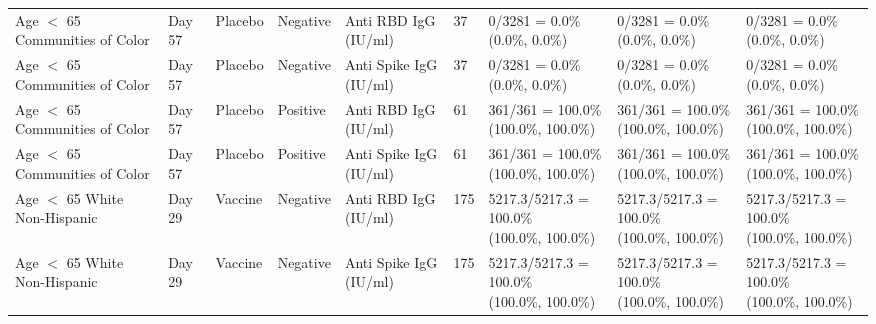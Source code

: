\documentclass[]{book}
\theoremstyle{definition}
\theoremstyle{definition}
\theoremstyle{definition}
\newcommand{\1}{\mathbbm{1}}
\begin{document}
\begin{landscape}
\begin{ThreePartTable}
\begin{longtable}[t]{>{\raggedright\arraybackslash}p{2.7cm}llllllll}
\hspace{1em}Age $<$ 65 Communities of Color & Day 57 & Placebo & Negative & Anti RBD IgG (IU/ml) & 37 & \makecell[l]{0/3281 = 0.0\%\\(0.0\%, 0.0\%)} & \makecell[l]{0/3281 = 0.0\%\\(0.0\%, 0.0\%)} & \makecell[l]{0/3281 = 0.0\%\\(0.0\%, 0.0\%)}\\
\hspace{1em}Age $<$ 65 Communities of Color & Day 57 & Placebo & Negative & Anti Spike IgG (IU/ml) & 37 & \makecell[l]{0/3281 = 0.0\%\\(0.0\%, 0.0\%)} & \makecell[l]{0/3281 = 0.0\%\\(0.0\%, 0.0\%)} & \makecell[l]{0/3281 = 0.0\%\\(0.0\%, 0.0\%)}\\
\hspace{1em}Age $<$ 65 Communities of Color & Day 57 & Placebo & Positive & Anti RBD IgG (IU/ml) & 61 & \makecell[l]{361/361 = 100.0\%\\(100.0\%, 100.0\%)} & \makecell[l]{361/361 = 100.0\%\\(100.0\%, 100.0\%)} & \makecell[l]{361/361 = 100.0\%\\(100.0\%, 100.0\%)}\\
\hspace{1em}Age $<$ 65 Communities of Color & Day 57 & Placebo & Positive & Anti Spike IgG (IU/ml) & 61 & \makecell[l]{361/361 = 100.0\%\\(100.0\%, 100.0\%)} & \makecell[l]{361/361 = 100.0\%\\(100.0\%, 100.0\%)} & \makecell[l]{361/361 = 100.0\%\\(100.0\%, 100.0\%)}\\
\hspace{1em}Age $<$ 65 White Non-Hispanic & Day 29 & Vaccine & Negative & Anti RBD IgG (IU/ml) & 175 & \makecell[l]{5217.3/5217.3 = 100.0\%\\(100.0\%, 100.0\%)} & \makecell[l]{5217.3/5217.3 = 100.0\%\\(100.0\%, 100.0\%)} & \makecell[l]{5217.3/5217.3 = 100.0\%\\(100.0\%, 100.0\%)}\\
\hspace{1em}Age $<$ 65 White Non-Hispanic & Day 29 & Vaccine & Negative & Anti Spike IgG (IU/ml) & 175 & \makecell[l]{5217.3/5217.3 = 100.0\%\\(100.0\%, 100.0\%)} & \makecell[l]{5217.3/5217.3 = 100.0\%\\(100.0\%, 100.0\%)} & \makecell[l]{5217.3/5217.3 = 100.0\%\\(100.0\%, 100.0\%)}\\

\end{longtable}
\end{ThreePartTable}
\end{landscape}
\end{document}
